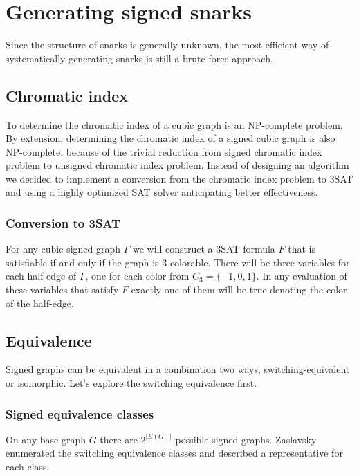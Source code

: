 \chapter{Generating signed snarks}

Since the structure of snarks is generally unknown, the most efficient way of systematically generating snarks is still a brute-force approach.

\section{Chromatic index}

To determine the chromatic index of a cubic graph is an NP-complete problem. By extension, determining the chromatic index of a signed cubic graph is also NP-complete, because of the trivial reduction from signed chromatic index problem to unsigned chromatic index problem. Instead of designing an algorithm we decided to implement a conversion from the chromatic index problem to 3SAT and using a highly optimized SAT solver anticipating better effectiveness.

\subsection{Conversion to 3SAT}

For any cubic signed graph $\Gamma$ we will construct a 3SAT formula $F$ that is satisfiable if and only if the graph is 3-colorable. There will be three variables for each half-edge of $\Gamma$, one for each color from $C_3 = \{-1, 0, 1\}$. In any evaluation of these variables that satisfy $F$ exactly one of them will be true denoting the color of the half-edge.

\section{Equivalence}

Signed graphs can be equivalent in a combination two ways, switching-equivalent or isomorphic. Let's explore the switching equivalence first.

\subsection{Signed equivalence classes}

On any base graph $G$ there are $2^{|E(G)|}$ possible signed graphs. Zaslavsky enumerated the switching equivalence classes and described a representative for each class.

